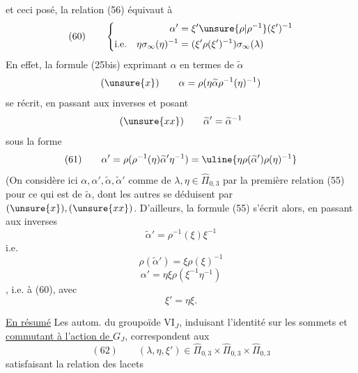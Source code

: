 et ceci posé, la relation (56) équivaut à
\[
(60)\qquad\left\{\begin{aligned}
\alpha'&=\xi'\unsure{\rho|\rho^{-1}}(\xi')^{-1}\\
\text{i.e.}\quad\eta\sigma_\infty(\eta)^{-1}&=(\xi'\rho(\xi')^{-1})\sigma_\infty(\lambda)
\end{aligned}\right.
\]
\quad{}
En effet, la formule (25bis) exprimant $\alpha$ en termes de $\widetilde\alpha$
\[
(\unsure{x})\qquad\alpha=\rho(\eta\widetilde\alpha\rho^{-1}(\eta)^{-1})
\]
se récrit, en passant aux inverses et posant
\[
(\unsure{xx})\qquad\widetilde\alpha'=\widetilde\alpha^{-1}
\]
sous la forme
\[
(61)\qquad\alpha'=\rho(\rho^{-1}(\eta)\widetilde\alpha'\eta^{-1})
=\uline{\eta\rho(\widetilde\alpha')\rho(\eta)^{-1}}
\]
(On considère ici $\alpha,\alpha',\widetilde\alpha,\widetilde\alpha'$ comme  de $\lambda,\eta\in\widehat\Pi_{0,3}$ par la première relation (55) pour ce qui est de $\widetilde\alpha$, dont les autres se déduisent par $(\unsure{x}),(\unsure{xx})$. D'ailleurs, la  formule (55)  s'écrit alors, en passant aux inverses
\[
\widetilde\alpha'=\rho^{-1}(\xi)\xi^{-1}
\]
i.e.
\[
\rho(\widetilde\alpha')=\xi\rho(\xi)^{-1}
\]
\[
\alpha'=\eta\xi\rho(\xi^{-1}\eta^{-1})
\]
,
i.e. à (60), avec
\[
\xi'=\eta\xi.
\]

\uline{En résumé} Les autom. du groupoïde $\mathrm{VI}_J$, induisant l'identité sur les sommets et \uline{commutant à l'action de $G_J$}, correspondent aux
\[
(62)\qquad\boxed{(\lambda,\eta,\xi')\in\widehat\Pi_{0,3}\times\widehat\Pi_{0,3}\times\widehat\Pi_{0,3}}
\]
satisfaisant la relation des lacets 


